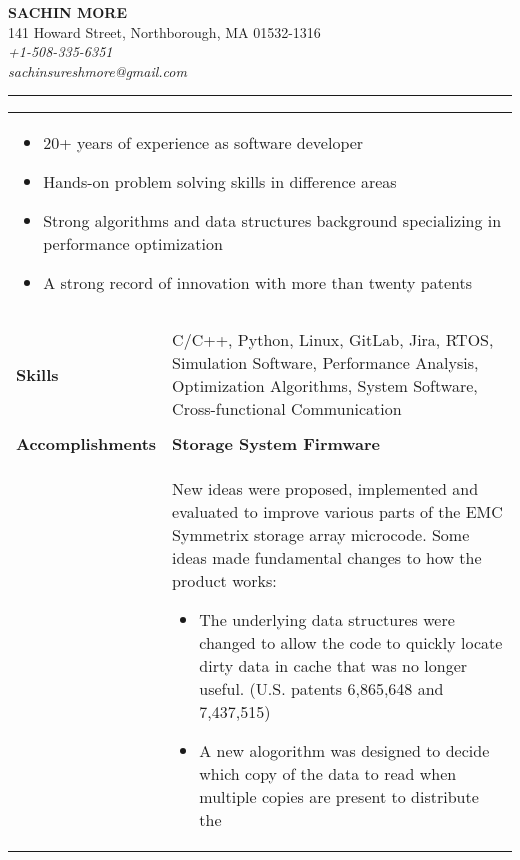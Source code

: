 \documentclass[10pt]{article}
\begin{document}
\begin{center}
{\bf \Large SACHIN MORE} \\
141 Howard Street, Northborough, MA 01532-1316 \\
{ \em +1-508-335-6351} \\
{\em sachinsureshmore@gmail.com}
\end{center}
\rule{\textwidth}{1pt}

\begin{longtable}{p{91pt}p{390pt}}
\\\multicolumn{2}{p{493pt}}{
    \begin{itemize}
        \item 20+ years of experience as software developer
        \item Hands-on problem solving skills in difference areas
        \item Strong algorithms and data structures background specializing
            in performance optimization
        \item A strong record of innovation with more than twenty patents
    \end{itemize}
}\\
\\\\
{\bf Skills}           & C/C++, Python, Linux, GitLab, Jira,
RTOS, Simulation Software, Performance Analysis, Optimization Algorithms,
System Software, Cross-functional Communication\\\\
{\bf Accomplishments}  & {\bf Storage System Firmware}\\
                       & {New ideas were proposed, implemented and evaluated to improve various parts of 
                          the EMC Symmetrix storage array microcode. Some ideas made
                          fundamental changes to how the product works:
                          \begin{itemize}
                              \item The underlying data structures were changed to
                                  allow the code to quickly locate dirty data in cache that
                                  was no longer useful. (U.S. patents 6,865,648 and 7,437,515)
                              \item A new alogorithm was designed to decide which copy of the data
                                  to read when multiple copies are present to distribute the

\end{itemize}}
\end{longtable}
\end{document}
